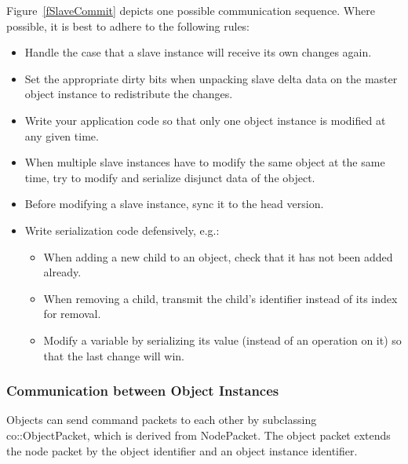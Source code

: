 \documentclass[10pt,a4]{scrartcl}
\newcommand{\fig}[1]{Figure~\ref{#1}}
\begin{document}
\fig{fSlaveCommit} depicts one possible communication sequence. Where possible,
it is best to adhere to the following rules:
\begin{itemize}
\item Handle the case that a slave instance will receive its own changes again.
\item Set the appropriate dirty bits when unpacking slave delta data on the
  master object instance to redistribute the changes.
\item Write your application code so that only one object instance is modified
  at any given time. 
\item When multiple slave instances have to modify the same object at the same
  time, try to modify and serialize disjunct data of the object.
\item Before modifying a slave instance, \textsf{sync} it to the head version.
\item Write serialization code defensively, e.g.:
  \begin{itemize}
  \item When adding a new child to an object, check that it has not been added
    already.
    \item When removing a child, transmit the child's identifier instead of its
      index for removal.
    \item Modify a variable by serializing its value (instead of an operation on
      it) so that the last change will win.
  \end{itemize}
\end{itemize}

\subsubsection{Communication between Object Instances}

Objects can send command packets to each other by subclassing
\textsf{co::Ob\-ject\-Packet}, which is derived from \textsf{NodePacket}. The
object packet extends the node packet by the object identifier and an object
instance identifier.
\end{document}
